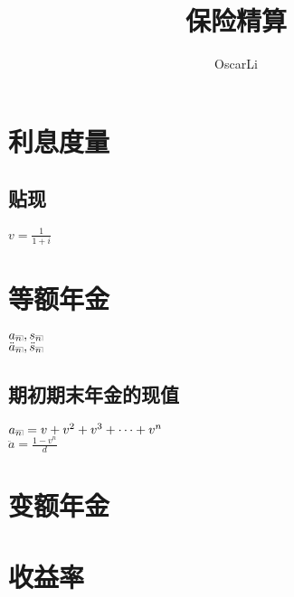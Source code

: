 \documentclass[oneside,a4papar,11pt,UTF8]{report}
\def\angles#1{{%
		\vbox{\hrule height .2pt
			\kern 1pt
			\hbox{$\scriptstyle {#1}\kern 1pt$}%
		}\kern-.05pt \vrule width .2pt
}}
\begin{document}
	\title{保险精算}
	\author{OscarLi}
	\maketitle 
	\tableofcontents
	\chapter{利息度量}
	
	\section{贴现}
	$v=\frac{1}{1+i}$
	\chapter{等额年金}
	\noindent$a_{\angles{n}},s_{\angles{n}}$\\	$\ddot{a}_{\angles{n}},\ddot{s}_{\angles{n}}$
	\section{期初期末年金的现值}
	$a_{\angles{n}}=v+v^2+v^3+\dots+v^n$
\\ $\ddot{a}=\frac{1-v^n}{d}$
\chapter{变额年金}

\chapter{收益率}
\end{document}
